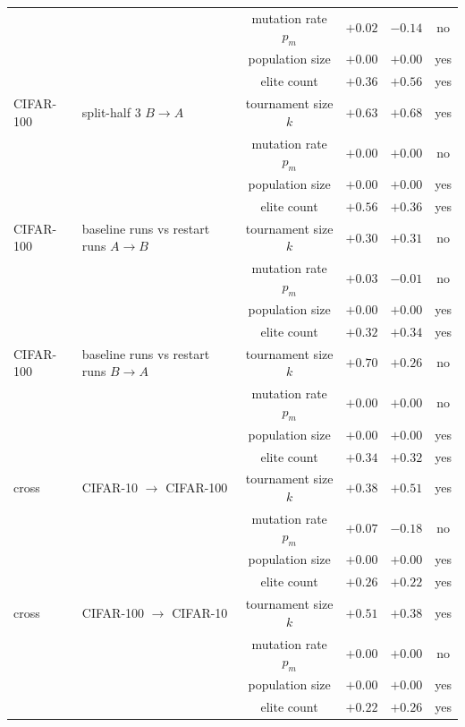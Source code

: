 \begin{tabular}{l l c rr c}
 &  & mutation rate $p_m$ & $+0.02$ & $-0.14$ & no \\
 &  & population size & $+0.00$ & $+0.00$ & yes \\
 &  & elite count & $+0.36$ & $+0.56$ & yes \\
CIFAR-100 & split-half 3 $B\!\to\!A$ & tournament size $k$ & $+0.63$ & $+0.68$ & yes \\
 &  & mutation rate $p_m$ & $+0.00$ & $+0.00$ & no \\
 &  & population size & $+0.00$ & $+0.00$ & yes \\
 &  & elite count & $+0.56$ & $+0.36$ & yes \\
\addlinespace
CIFAR-100 & baseline runs vs restart runs $A\!\to\!B$ & tournament size $k$ & $+0.30$ & $+0.31$ & no \\
 &  & mutation rate $p_m$ & $+0.03$ & $-0.01$ & no \\
 &  & population size & $+0.00$ & $+0.00$ & yes \\
 &  & elite count & $+0.32$ & $+0.34$ & yes \\
CIFAR-100 & baseline runs vs restart runs $B\!\to\!A$ & tournament size $k$ & $+0.70$ & $+0.26$ & no \\
 &  & mutation rate $p_m$ & $+0.00$ & $+0.00$ & no \\
 &  & population size & $+0.00$ & $+0.00$ & yes \\
 &  & elite count & $+0.34$ & $+0.32$ & yes \\
\addlinespace
cross & CIFAR-10 $\to$ CIFAR-100 & tournament size $k$ & $+0.38$ & $+0.51$ & yes \\
 &  & mutation rate $p_m$ & $+0.07$ & $-0.18$ & no \\
 &  & population size & $+0.00$ & $+0.00$ & yes \\
 &  & elite count & $+0.26$ & $+0.22$ & yes \\
cross & CIFAR-100 $\to$ CIFAR-10 & tournament size $k$ & $+0.51$ & $+0.38$ & yes \\
 &  & mutation rate $p_m$ & $+0.00$ & $+0.00$ & no \\
 &  & population size & $+0.00$ & $+0.00$ & yes \\
 &  & elite count & $+0.22$ & $+0.26$ & yes \\
\bottomrule
\end{tabular}
